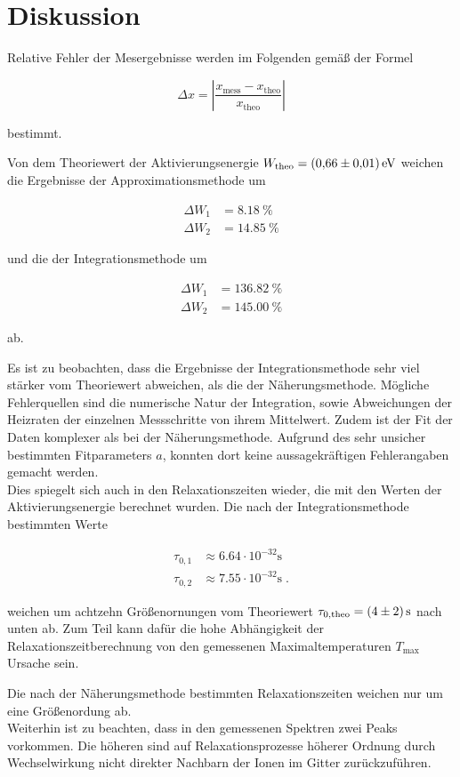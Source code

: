 \section{Diskussion}
\label{sec:Diskussion}

Relative Fehler der Mesergebnisse werden im Folgenden gemäß der Formel

\begin{equation}
    \Delta x = \left| \frac{x_\text{mess} - x_\text{theo}}{x_\text{theo}}\right|
\end{equation}

bestimmt. 

Von dem Theoriewert der Aktivierungsenergie $W_\text{theo} = \SI{0.66 +- 0.01}{\eV}$ 
weichen die Ergebnisse der Approximationsmethode um

\begin{align*}
    \Delta W_1 &= \SI{8.18}{\percent} \\
    \Delta W_2 &= \SI{14.85}{\percent}
\end{align*}

und die der Integrationsmethode um

\begin{align*}
    \Delta W_1 &= \SI{136.82}{\percent} \\
    \Delta W_2 &= \SI{145.00}{\percent} 
\end{align*}

ab.

Es ist zu beobachten, dass die Ergebnisse der Integrationsmethode sehr viel stärker vom Theoriewert abweichen, 
als die der Näherungsmethode. Mögliche Fehlerquellen sind die numerische Natur der Integration, sowie Abweichungen der
Heizraten der einzelnen Messschritte von ihrem Mittelwert. Zudem ist der Fit der Daten komplexer als bei der
Näherungsmethode. Aufgrund des sehr unsicher bestimmten Fitparameters $a$, konnten dort keine aussagekräftigen Fehlerangaben
gemacht werden. \\

Dies spiegelt sich auch in den Relaxationszeiten wieder, die mit den Werten der Aktivierungsenergie berechnet wurden.
Die nach der Integrationsmethode bestimmten Werte

\begin{align*}
    \tau_{0,1} &\approx \num{6.64} \cdot 10^{-32} \si{\second}\\
    \tau_{0,2} &\approx \num{7.55} \cdot 10^{-32} \si{\second} \; .
\end{align*}

weichen um achtzehn Größenornungen vom Theoriewert
$\tau_{0,\text{theo}} = \SI{4 +- 2}{\second}$ nach unten ab. Zum Teil kann dafür die hohe Abhängigkeit der Relaxationszeitberechnung
von den gemessenen Maximaltemperaturen $T_\text{max}$ Ursache sein.

Die nach der Näherungsmethode bestimmten Relaxationszeiten weichen nur um eine Größenordung ab.\\

Weiterhin ist zu beachten, dass in den gemessenen Spektren zwei Peaks vorkommen. Die höheren sind auf Relaxationsprozesse
höherer Ordnung durch Wechselwirkung nicht direkter Nachbarn der Ionen im Gitter zurückzuführen. 


